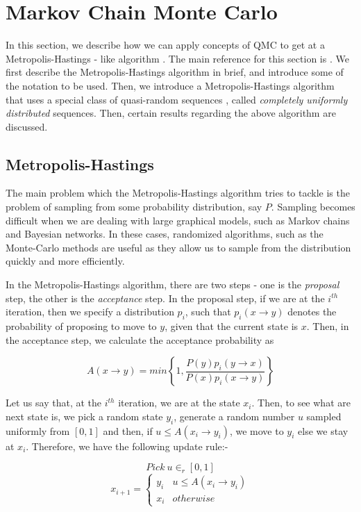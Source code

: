 \documentclass[12pt,letterpaper, twoside]{article}
\theoremstyle{definition}
\begin{document}
\section{Markov Chain Monte Carlo}
In this section, we describe how we can apply concepts of QMC to get at a Metropolis-Hastings - like algorithm \cite{owenReport}\cite{owenBook}\cite{cryptoExample}\cite{MCMCslides}. The main reference for this section is \cite{owenReport}. We first describe the Metropolis-Hastings algorithm in brief, and introduce some of the notation to be used. Then, we introduce a Metropolis-Hastings algorithm that uses a special class of quasi-random sequences \cite{owenReport}\cite{owenReport2}, called \emph{completely uniformly distributed} sequences. Then, certain results regarding the above algorithm are discussed.

\subsection{Metropolis-Hastings}
The main problem which the Metropolis-Hastings algorithm tries to tackle is the problem of sampling from some probability distribution, say $P$. Sampling becomes difficult when we are dealing with large graphical models, such as Markov chains and Bayesian networks. In these cases, randomized algorithms, such as the Monte-Carlo methods are useful as they allow us to sample from the distribution quickly and more efficiently. 

In the Metropolis-Hastings algorithm, there are two steps - one is the \emph{proposal} step, the other is the \emph{acceptance} step. In the proposal step, if we are at the $i^{th}$ iteration, then we specify a distribution $p_i$, such that $p_i(x \to y)$ denotes the probability of proposing to move to $y$, given that the current state is $x$. Then, in the acceptance step, we calculate the acceptance probability as 

$$
A(x \to y) = min \left\{ 1,\frac{P(y)p_i(y \to x)}{P(x)p_i(x \to y)}\right\}
$$

Let us say that, at the $i^{th}$ iteration, we are at the state $x_i$. Then, to see what are next state is, we pick a random state $y_i$, generate a random number $u$ sampled uniformly from $[0,1]$ and then, if $u \leq A(x_i \to y_i)$, we move to $y_i$ else we stay at $x_i$. Therefore, we have the following update rule:-

$$
Pick \ u \in_r [0,1]
$$
$$
x_{i+1} =  \begin{cases} 
    y_i & u \leq A(x_i \to y_i) \\
    x_i & otherwise
    \end{cases}
$$
\end{document}
